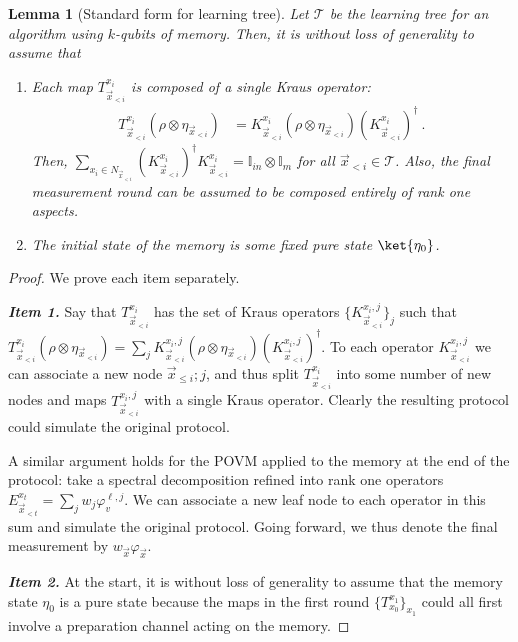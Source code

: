 \documentclass[11pt]{article}
\newtheorem{lemma}[theorem]{Lemma}
\newcommand{\id}{\ensuremath{\mathbb{I}}}
\newcommand{\xll}{\vec{x}_{<i}}
\begin{document}
\begin{lemma}[Standard form for learning tree]\label{lem:tree_standard}
    Let $\mathcal{T}$ be the learning tree for an algorithm using $k$-qubits of memory. Then, it is without loss of generality to assume that
    \begin{enumerate}
        \item Each map $T_{\xll}^{x_i}$ is composed of a single Kraus operator:
    \begin{align*}
        T_{\vec{x}_{<i}}^{x_i}(\rho\otimes \eta_{\xll}) & = K_{\xll}^{x_i} (\rho \otimes \eta_{\xll}) (K_{\xll}^{x_i})^\dagger\ .
    \end{align*}
    Then, $\sum_{x_i \in N_{\xll}}(K_{\xll}^{x_i})^\dagger K_{\xll}^{x_i} = \id_{in} \otimes \id_m$ for all $\xll\in\mathcal{T}$. Also, the final measurement round can be assumed to be composed entirely of rank one aspects.

    \item The initial state of the memory is some fixed pure state $\ket{\eta_0}$.
    \end{enumerate}
\end{lemma}
\begin{proof}
  We prove each item separately. 
  
  \textbf{\emph{Item 1.}} Say that $T_{\xll}^{x_i}$ has the set of Kraus operators $\{K_{\xll}^{x_{i},j}\}_j$ such that $T_{\xll}^{x_{i}}(\rho\otimes \eta_{\xll}) = \sum_j K_{\xll}^{x_{i},j} (\rho\otimes \eta_{\xll})(K_{\xll}^{x_{i},j} )^\dagger$. To each operator $K_{\xll}^{x_i,j}$ we can associate a new node $\vec{x}_{\leq i};j$, and thus split $T^{x_i}_{\xll}$ into some number of new nodes and maps $T^{x_i,j}_{\xll}$ with a single Kraus operator. Clearly the resulting protocol could simulate the original protocol. 

    A similar argument holds for the POVM applied to the memory at the end of the protocol: take a spectral decomposition refined into rank one operators $E_{\vec{x}_{< t}}^{x_t} = \sum_j w_j \varphi_v^{\ell,j}$. We can associate a new leaf node to each operator in this sum and simulate the original protocol. Going forward, we thus denote the final measurement by $w_{\vec{x}} \varphi_{\vec{x}}$.

  \textbf{\emph{Item 2.}}  At the start, it is without loss of generality to assume that the memory state $\eta_0$ is a pure state because the maps in the first round $\{T_{x_0}^{x_1}\}_{x_1}$ could all first involve a preparation channel acting on the memory.
\end{proof}
\end{document}
